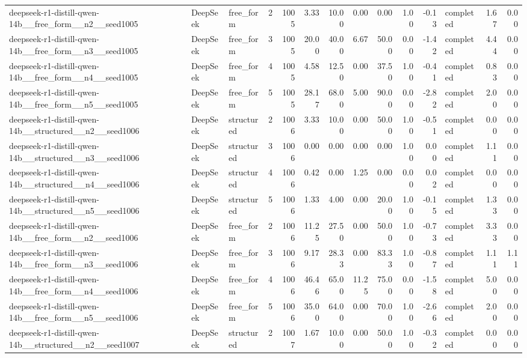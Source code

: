 \begin{longtable}{lllrrrrrrrrlrr}
deepseek-r1-distill-qwen-14b\_\_free\_form\_\_n2\_\_seed1005 & DeepSeek & free\_form & 2 & 1005 & 3.33 & 10.00 & 0.00 & 0.00 & 1.00 & -0.13 & completed & 1.67 & 0.00 \\
deepseek-r1-distill-qwen-14b\_\_free\_form\_\_n3\_\_seed1005 & DeepSeek & free\_form & 3 & 1005 & 20.00 & 40.00 & 6.67 & 50.00 & 0.00 & -1.42 & completed & 4.44 & 0.00 \\
deepseek-r1-distill-qwen-14b\_\_free\_form\_\_n4\_\_seed1005 & DeepSeek & free\_form & 4 & 1005 & 4.58 & 12.50 & 0.00 & 37.50 & 1.00 & -0.41 & completed & 0.83 & 0.00 \\
deepseek-r1-distill-qwen-14b\_\_free\_form\_\_n5\_\_seed1005 & DeepSeek & free\_form & 5 & 1005 & 28.17 & 68.00 & 5.00 & 90.00 & 0.00 & -2.82 & completed & 2.00 & 0.00 \\
deepseek-r1-distill-qwen-14b\_\_structured\_\_n2\_\_seed1006 & DeepSeek & structured & 2 & 1006 & 3.33 & 10.00 & 0.00 & 50.00 & 1.00 & -0.51 & completed & 0.00 & 0.00 \\
deepseek-r1-distill-qwen-14b\_\_structured\_\_n3\_\_seed1006 & DeepSeek & structured & 3 & 1006 & 0.00 & 0.00 & 0.00 & 0.00 & 1.00 & 0.00 & completed & 1.11 & 0.00 \\
deepseek-r1-distill-qwen-14b\_\_structured\_\_n4\_\_seed1006 & DeepSeek & structured & 4 & 1006 & 0.42 & 0.00 & 1.25 & 0.00 & 0.00 & 0.02 & completed & 0.00 & 0.00 \\
deepseek-r1-distill-qwen-14b\_\_structured\_\_n5\_\_seed1006 & DeepSeek & structured & 5 & 1006 & 1.33 & 4.00 & 0.00 & 20.00 & 1.00 & -0.15 & completed & 1.33 & 0.00 \\
deepseek-r1-distill-qwen-14b\_\_free\_form\_\_n2\_\_seed1006 & DeepSeek & free\_form & 2 & 1006 & 11.25 & 27.50 & 0.00 & 50.00 & 1.00 & -0.73 & completed & 3.33 & 0.00 \\
deepseek-r1-distill-qwen-14b\_\_free\_form\_\_n3\_\_seed1006 & DeepSeek & free\_form & 3 & 1006 & 9.17 & 28.33 & 0.00 & 83.33 & 1.00 & -0.87 & completed & 1.11 & 1.11 \\
deepseek-r1-distill-qwen-14b\_\_free\_form\_\_n4\_\_seed1006 & DeepSeek & free\_form & 4 & 1006 & 46.46 & 65.00 & 11.25 & 75.00 & 0.00 & -1.58 & completed & 5.00 & 0.00 \\
deepseek-r1-distill-qwen-14b\_\_free\_form\_\_n5\_\_seed1006 & DeepSeek & free\_form & 5 & 1006 & 35.00 & 64.00 & 0.00 & 70.00 & 1.00 & -2.66 & completed & 2.00 & 0.00 \\
deepseek-r1-distill-qwen-14b\_\_structured\_\_n2\_\_seed1007 & DeepSeek & structured & 2 & 1007 & 1.67 & 10.00 & 0.00 & 50.00 & 1.00 & -0.32 & completed & 0.00 & 0.00 \\

\end{longtable}
